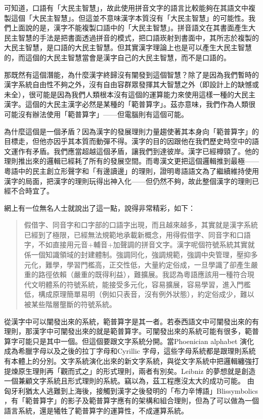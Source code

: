 \documentclass[a5paper, 10pt, openany]{book} %
\begin{document}
可知道，口語有「大民主智慧」，故此使用拼音文字的語言比較能夠在其語文中複製這個「大民主智慧」。但這並不意味漢字本質沒有「大民主智慧」的可能性。我們上面說的是，漢字不能複製口語中的「大民主智慧」。拼音語文在其書面產生大民主智慧的手法是把書面透過拼音的模式，把口語崁射到書面中，其所志於複製的大民主智慧，是口語的大民主智慧。但其實漢字理論上也是可以產生大民主智慧的，而這個的大民主智慧當會是漢字自己的大民主智慧，而不是口語的。

那既然有這個潛能，為什麼漢字終歸沒有闡發到這個智慧？除了是因為我們暫時的漢字系統自由性不夠之外，沒有自由容群眾發揮其大智慧之外（即設計上的缺憾或未全），很可能是因為我們人類根本沒有這個的運算能力來使用這樣一種的大民主漢字。這個的大民主漢字必然是某種的「範普算字」。茲亦意味，我們作為人類很可能沒有辦法使用「範普算字」——但電腦則有這個可能。

為什麼這個是一個矛盾？因為漢字的發展理則力量趨使著其本身向「範普算字」的目標走，但他亦因乎其本質而動彈不得。漢字的目的因跟他在我們歷史時空中的語文運作有矛盾。我們應當超越這個矛盾，讓我們到達彼岸。漢字已經樽頸了。他的理則推出來的邏輯已經耗了所有的發展空間。而粵漢文更把這個邏輯推到最極——粵語中的民主創立形聲字和「有邊讀邊」的理則，證明粵語語文為了繼續維持使用漢字的局面，把漢字的理則玩得出神入化——但仍然不夠，故此整個漢字的理則已經不合時宜了。

網上有一位無名人士就說出了這一點，說得非常精彩，如下：

\begin{quotation}
  假借字、同音字和口字部的口語字出現，而且越來越多，其實就是漢字系統已經到了極限，已經無法規範地承載新概念，用得假借字、同音字和口語字，不如直接用元音+輔音+加聲調的拼音文字。漢字呢個符號系統其實就係一個知識領域的封建體制。強調同化，強調規範，強調中央管理，壓抑多元化，難學，學習門檻高，正交性低，大量約定俗成，一旦學識了卻產生嚴重的路徑依賴（嚴重的既得利益），難擴展。我認為粵語應該用一種符合現代文明體系的符號系統，能接受多元化，容易擴展，容易學習，進入門檻低，構成原理簡單易明（例如只表音，沒有例外狀態），約定俗成少，難以被某些階層壟斷的符號系統。 

\end{quotation}

從漢字中可以闡發出來的系統，範普算字是其一者。若泰西語文中可闡發出來的有理則，那漢字中可闡發出來的就是範普算字。可闡發出來的系統可能有很多，範普算字可能只是其中一個。但這個要跟文字系統分開。當Phoenician alphabet 演化成為希臘字母以及之後的拉丁字母和Cyrillic 字母，這些字母系統都是跟理則系統有本體上的分別。文字系統演化出來的新文字系統，與從文字系統中把邏輯纏強打提煉原生理則再「觀而式之」的形式理則，兩者有別矣。Leibniz 的夢想就是創造一個兼顧文字系統且形式理則的系統。竊以為，茲工程應沒太大的成功可能。 由匈牙利猶太人逃難到上海後，接觸到漢字之後發明的「布力辛博語」Blissymbolics ，有「範普算字」的影子及範普算字應有的架構和組合理則，但為了可以做為一個語言系統，還是犧牲了範普算字的運算性，不成運算系統。 
\end{document}
